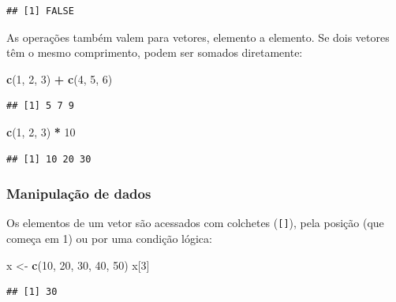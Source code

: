 \documentclass[
]{book}
\newenvironment{Shaded}{\begin{snugshade}}{\end{snugshade}}
\newcommand{\DecValTok}[1]{\textcolor[rgb]{0.00,0.00,0.81}{#1}}
\newcommand{\FunctionTok}[1]{\textcolor[rgb]{0.13,0.29,0.53}{\textbf{#1}}}
\newcommand{\NormalTok}[1]{#1}
\newcommand{\OtherTok}[1]{\textcolor[rgb]{0.56,0.35,0.01}{#1}}
\newcommand{\SpecialCharTok}[1]{\textcolor[rgb]{0.81,0.36,0.00}{\textbf{#1}}}
\begin{document}
\begin{verbatim}
## [1] FALSE
\end{verbatim}

As operações também valem para vetores, elemento a elemento. Se dois vetores têm o mesmo comprimento, podem ser somados diretamente:

\begin{Shaded}
\begin{Highlighting}[]
\FunctionTok{c}\NormalTok{(}\DecValTok{1}\NormalTok{, }\DecValTok{2}\NormalTok{, }\DecValTok{3}\NormalTok{) }\SpecialCharTok{+} \FunctionTok{c}\NormalTok{(}\DecValTok{4}\NormalTok{, }\DecValTok{5}\NormalTok{, }\DecValTok{6}\NormalTok{)}
\end{Highlighting}
\end{Shaded}

\begin{verbatim}
## [1] 5 7 9
\end{verbatim}

\begin{Shaded}
\begin{Highlighting}[]
\FunctionTok{c}\NormalTok{(}\DecValTok{1}\NormalTok{, }\DecValTok{2}\NormalTok{, }\DecValTok{3}\NormalTok{) }\SpecialCharTok{*} \DecValTok{10}
\end{Highlighting}
\end{Shaded}

\begin{verbatim}
## [1] 10 20 30
\end{verbatim}

\subsubsection{Manipulação de dados}\label{manipulauxe7uxe3o-de-dados}

Os elementos de um vetor são acessados com colchetes (\texttt{{[}{]}}), pela posição (que começa em 1) ou por uma condição lógica:

\begin{Shaded}
\begin{Highlighting}[]
\NormalTok{x }\OtherTok{\textless{}{-}} \FunctionTok{c}\NormalTok{(}\DecValTok{10}\NormalTok{, }\DecValTok{20}\NormalTok{, }\DecValTok{30}\NormalTok{, }\DecValTok{40}\NormalTok{, }\DecValTok{50}\NormalTok{)}
\NormalTok{x[}\DecValTok{3}\NormalTok{]}
\end{Highlighting}
\end{Shaded}

\begin{verbatim}
## [1] 30
\end{verbatim}
\end{document}
